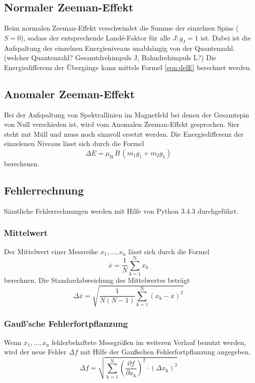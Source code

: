 \subsection{Normaler Zeeman-Effekt}
Beim normalen Zeeman-Effekt verschwindet die Summe der einzelnen Spins ($S=0$), sodass der entsprechende Landé-Faktor für alle $J : g_\text{J} = 1$ ist. Dabei ist die Aufspaltung der einzelnen Energieniveaus unabhängig von der Quantenzahl.(welcher Quantenzahl? Gesamtdrehimpuls J, Bahndrehimpuls L?) Die Energiedifferenz der Übergänge kann mittels Formel \ref{eqn:delE} berechnet werden.
\subsection{Anomaler Zeeman-Effekt}
Bei der Aufspaltung von Spektrallinien im Magnetfeld bei denen der Gesamtspin von Null verschieden ist, wird vom Anomalen Zeeman-Effekt gesprochen. Sier steht nut Müll und muss noch sinnvoll ersetzt werden. Die Energiedifferenz der einzelenen Niveaus lässt sich durch die Formel
\begin{equation}
  \Delta E = \mu_\text{B}\,B\,(m_1 g_1 + m_2 g_1)
  \label{eqn:dE}
\end{equation}
berechenen.

\subsection{Fehlerrechnung}
Sämtliche Fehlerrechnungen werden mit Hilfe von Python 3.4.3 durchgeführt.
\subsubsection{Mittelwert}
Der Mittelwert einer Messreihe $x_\text{1}, ... ,x_\text{n}$ lässt sich durch die Formel
\begin{equation}
	\overline{x} = \frac{1}{N} \sum_{\text{k}=1}^\text{N} x_k
	\label{eqn:ave}
\end{equation}
berechnen. Die Standardabweichung des Mittelwertes beträgt
\begin{equation}
	\Delta \overline{x} = \sqrt{ \frac{1}{N(N-1)} \sum_{\text{k}=1}^\text{N} (x_\text{k} - \overline{x})^2}
	\label{eqn:std}
\end{equation}

\subsubsection{Gauß'sche Fehlerfortpflanzung}
Wenn $x_\text{1}, ..., x_\text{n}$ fehlerbehaftete Messgrößen im weiteren Verlauf benutzt werden, wird der neue Fehler $\Delta f$ mit Hilfe der Gaußschen Fehlerfortpflanzung angegeben.
\begin{equation}
	\Delta f = \sqrt{\sum_{\text{k}=1}^\text{N} \left( \frac{ \partial f}{\partial x_\text{k}} \right) ^2 \cdot (\Delta x_\text{k})^2}
	\label{eqn:var}
\end{equation}

